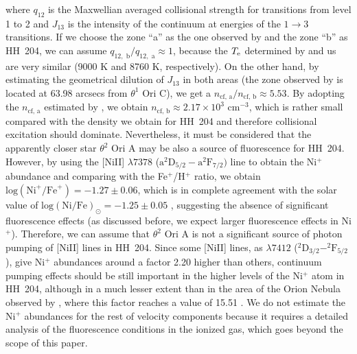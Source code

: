\documentclass[twocolumn]{aastex63}
\begin{document}
\noindent where $q_{12}$ is the Maxwellian averaged collisional strength for transitions from level 1 to 2 and $J_{13}$ is the intensity of the continuum at energies of the $1 \rightarrow 3$ transitions. If we choose the zone ``a'' as the one observed by \citet{Osterbrock92} and the zone  ``b'' as HH~204, 
we can assume ${q_{12,\text{ b}}}/{q_{12,\text{ a}}}\approx 1$, because the $T_{\rm e}$ determined by \citet{Osterbrock92} and us are very similar (9000 K and 8760 K, respectively). On the other hand, by estimating the geometrical dilution of $J_{13}$ in both areas (the zone observed by \citet{Osterbrock92} is  located at 63.98 arcsecs from $\theta^{1} \text{ Ori C}$), we get a $n_{\text{cf, a}}/n_{\text{cf, b}}\approx5.53$. By adopting the $n_{\text{cf, a}}$ estimated by \citet{Bautista96}, we obtain  $n_{\text{cf, b}}\approx 2.17 \times 10^{3} \text{ cm}^{-3}$, which is rather small compared with the density we obtain for HH~204 and therefore collisional excitation should dominate. Nevertheless, it must be considered that the apparently closer star $\theta^{2} \text{ Ori A}$  may be also a source of fluorescence for HH~204. However, by using the [Ni\thinspace II] $\lambda 7378$ ($\text{a}^{2}\text{D}_{5/2}-\text{a}^{2}\text{F}_{7/2})$ line to obtain the Ni$^{+}$ abundance and comparing with the Fe$^{+}$/H$^+$ ratio, we obtain $\text{log}(\text{Ni}^{+}/\text{Fe}^{+})=-1.27 \pm 0.06$, which is in complete agreement with the solar value of $\text{log}(\text{Ni}/\text{Fe})_{\odot}=-1.25 \pm 0.05$ \citep{lodders19}, suggesting the absence of significant fluorescence effects (as discussed before, we expect larger fluorescence effects in Ni$^+$). Therefore, we can assume that $\theta^{2} \text{ Ori A}$ is not a significant source of photon pumping of [Ni\thinspace II] lines in HH~204. Since some  [Ni\thinspace II] lines, as $\lambda 7412$ ($^2 \text{D}_{3/2}-^2\text{F}_{5/2}$), give Ni$^+$ abundances around a factor 2.20 higher than others, continuum pumping effects should be still important in the higher levels of the Ni$^{+}$ atom in HH~204, although in a much lesser extent than in the area of the Orion Nebula observed by \citet{Osterbrock92}, where this factor reaches a value of 15.51 \citep{Lucy95}. We do not estimate the  Ni$^{+}$ abundances for the rest of velocity components because it requires a detailed  analysis of the fluorescence conditions in the ionized gas, which goes beyond the scope of this paper. 
\end{document}
